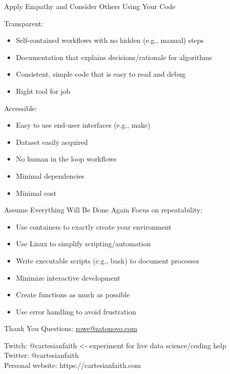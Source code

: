 \documentclass{beamer}
\begin{document}
\begin{frame}{Apply Empathy and Consider Others Using Your Code}

Transparent:

\begin{itemize}
\item Self-contained workflows with no hidden (e.g., manual) steps
\item Documentation that explains decisions/rationale for algorithms
\item Consistent, simple code that is easy to read and debug
\item Right tool for job
\end{itemize}

\pause
Accessible:

\begin{itemize}
\item Easy to use end-user interfaces (e.g., make)
\item Dataset easily acquired
\item No human in the loop workflows
\item Minimal dependencies
\item Minimal cost
\end{itemize}

\end{frame}




%
%
%
%





\begin{frame}{Assume Everything Will Be Done Again}
Focus on repeatability:

\begin{itemize}
\item Use containers to exactly create your environment
\item Use Linux to simplify scripting/automation
\item Write executable scripts (e.g., bash) to document processes
\item Minimize interactive development
\item Create functions as much as possible
\item Use error handling to avoid frustration
\end{itemize}

\end{frame}


\begin{frame}{Thank You}
Questions: \href{mailto:rowe@zatonovo.com}{rowe@zatonovo.com}

Twitch: @cartesianfaith <- experiment for live data science/coding help\\
Twitter: @cartesianfaith\\
Personal website: https://cartesianfaith.com

\end{frame}

\appendix
\end{document}

